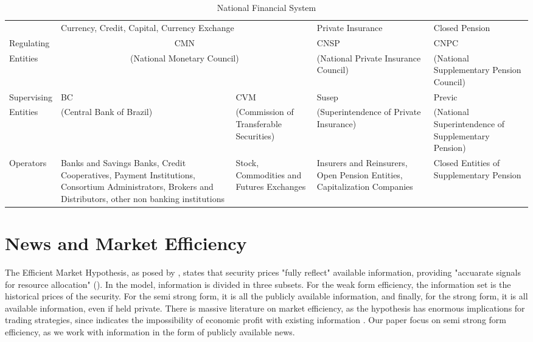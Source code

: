 \documentclass[a4paper]{article}
\begin{document}
\begin{table}[H]
\caption{National Financial System}
\label{tab:sistemanacional}
\centering
\begin{tabular}{lp{2.5cm}|p{2.5cm}|p{2.5cm}|p{2.5cm}}
 & \multicolumn{2}{p{5cm}||}{Currency, Credit, Capital, Currency Exchange} & \multicolumn{1}{l||}{Private Insurance} & \multicolumn{1}{l}{Closed Pension} \\ \cline{2-5} 
\multicolumn{1}{l|}{Regulating} & \multicolumn{2}{c||}{CMN} & \multicolumn{1}{p{2.5cm}||}{CNSP} & \multicolumn{1}{p{2.5cm}|}{CNPC} \\
\multicolumn{1}{l|}{Entities} & \multicolumn{2}{c||}{(National Monetary Council)} & \multicolumn{1}{p{2.5cm}||}{(National Private Insurance Council)} & \multicolumn{1}{p{2.5cm}|}{(National Supplementary Pension Council)} \\ \hline
\multicolumn{1}{l|}{Supervising} & \multicolumn{1}{p{2.5cm}||}{BC} & \multicolumn{1}{p{2.5cm}||}{CVM} & \multicolumn{1}{p{2.5cm}||}{Susep} & \multicolumn{1}{p{2.5cm}|}{Previc} \\
\multicolumn{1}{l|}{Entities} & \multicolumn{1}{p{2.5cm}||}{(Central Bank of Brazil)} & \multicolumn{1}{p{2.5cm}||}{(Commission of Transferable Securities)} & \multicolumn{1}{p{2.75cm}||}{(Superintendence of Private Insurance)} & \multicolumn{1}{p{2.5cm}|}{(National Superintendence of Supplementary Pension)} \\ \hline
\multicolumn{1}{l|}{Operators} & \multicolumn{1}{p{2.5cm}||}{Banks and Savings Banks,  Credit Cooperatives, Payment Institutions, Consortium Administrators, Brokers and Distributors, other non banking institutions} & \multicolumn{1}{p{2.5cm}||}{Stock, Commodities and Futures Exchanges} & \multicolumn{1}{p{2.5cm}||}{Insurers and Reinsurers, Open Pension Entities, Capitalization Companies} & \multicolumn{1}{p{2.5cm}|}{Closed Entities of Supplementary Pension} \\ \cline{2-5} 
\end{tabular}
\end{table}

\section{News and Market Efficiency}


The Efficient Market Hypothesis, as posed by \citet{fama1970}, states that security prices "fully reflect" available information, providing "accuarate signals for resource allocation" (\citet{fama1970}). In the model, information is divided in three subsets. For the weak form efficiency, the information set is the historical prices of the security. For the semi strong form, it is all the publicly available information, and finally, for the strong form, it is all available information, even if held private. There is massive literature on market efficiency, as the hypothesis has enormous implications for trading strategies, since indicates the impossibility of economic profit with existing information \citet{kamal2014}. Our paper focus on semi strong form efficiency, as we work with information in the form of publicly available news.
\end{document}
